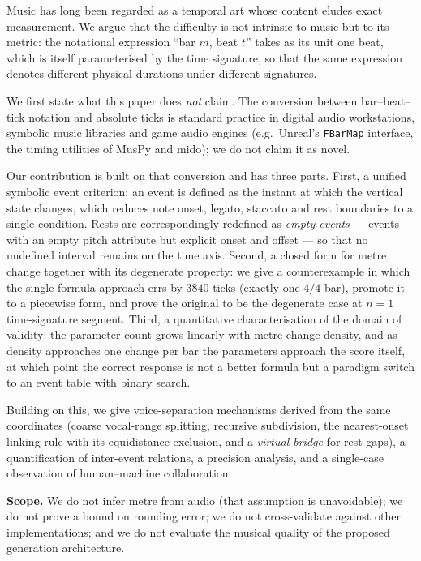 \documentclass[11pt,a4paper,fontset=none]{ctexart}
\begin{document}



\begin{英文摘要}

Music has long been regarded as a temporal art whose content eludes exact
measurement. We argue that the difficulty is not intrinsic to music but to its
metric: the notational expression ``bar $m$, beat $t$'' takes as its unit one
beat, which is itself parameterised by the time signature, so that the same
expression denotes different physical durations under different signatures.

We first state what this paper does \emph{not} claim. The conversion between
bar--beat--tick notation and absolute ticks is standard practice in digital
audio workstations, symbolic music libraries and game audio engines (e.g.\
Unreal's \texttt{FBarMap} interface, the timing utilities of MusPy and mido);
we do not claim it as novel.

Our contribution is built on that conversion and has three parts. First, a
unified symbolic event criterion: an event is defined as the instant at which
the vertical state changes, which reduces note onset, legato, staccato and rest
boundaries to a single condition. Rests are correspondingly redefined as
\emph{empty events} --- events with an empty pitch attribute but explicit onset
and offset --- so that no undefined interval remains on the time axis. Second,
a closed form for metre change together with its degenerate property: we give a
counterexample in which the single-formula approach errs by $3840$ ticks
(exactly one $4/4$ bar), promote it to a piecewise form, and prove the original
to be the degenerate case at $n=1$ time-signature segment. Third, a
quantitative characterisation of the domain of validity: the parameter count
grows linearly with metre-change density, and as density approaches one change
per bar the parameters approach the score itself, at which point the correct
response is not a better formula but a paradigm switch to an event table with
binary search.

Building on this, we give voice-separation mechanisms derived from the same
coordinates (coarse vocal-range splitting, recursive subdivision, the
nearest-onset linking rule with its equidistance exclusion, and a \emph{virtual
bridge} for rest gaps), a quantification of inter-event relations, a precision
analysis, and a single-case observation of human--machine collaboration.

\textbf{Scope.} We do not infer metre from audio (that assumption is
unavoidable); we do not prove a bound on rounding error; we do not
cross-validate against other implementations; and we do not evaluate the
musical quality of the proposed generation architecture.
\end{英文摘要}
\end{document}
